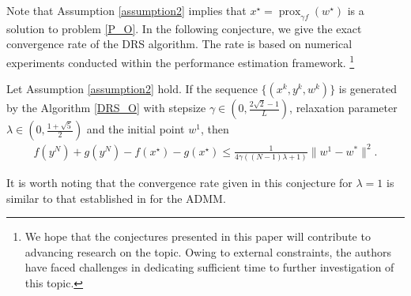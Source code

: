 \documentclass[ijoc,sglanonrev]{informs4}
\begin{document}
Note that Assumption \ref{assumption2} implies that $x^\star=\operatorname{prox}_{\gamma f}(w^\star)$ is a solution to problem \eqref{P_O}. In the following conjecture, we give the exact convergence rate of the DRS algorithm. The rate is based on numerical experiments conducted within the performance estimation framework. \footnote{We hope that the conjectures presented in this paper will contribute to advancing research on the topic. Owing to external constraints, the authors have faced challenges in dedicating sufficient time to further investigation of this topic.}

\begin{conjecture} \label{Conjecture_2}
Let Assumption \ref{assumption2} hold. If the sequence $\{(x^k, y^k, w^k)\}$ is generated by the Algorithm \ref{DRS_O} with stepsize $\gamma\in (0, \tfrac{2\sqrt{2}-1}{L})$, relaxation parameter $\lambda\in (0, \tfrac{1+\sqrt{5}}{2})$ and the initial point $w^1$, then 
\begin{align*}
 f(y^N)+g(y^N) - f(x^\star)-g(x^\star) \leq \frac{1 }{4\gamma((N-1)\lambda + 1)}\|w^1 - w^*\|^2. 
\end{align*}
\end{conjecture}

It is worth noting that the convergence rate given in this conjecture for $\lambda = 1$ is similar to that established in \cite{zamani2024exact2} for the ADMM.

\end{document}
